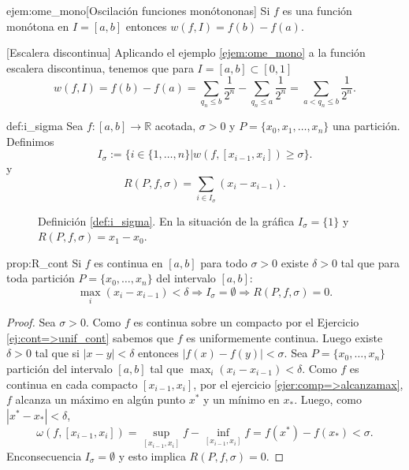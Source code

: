  

\begin{ejercicio}{ejem:ome_mono}[Oscilación funciones monótononas]  Si $f$ es una función monótona   en $I=[a,b]$ entonces $w(f,I)=f(b)-f(a)$.
\end{ejercicio}

 \begin{ejemplo}{}[Escalera discontinua]  Aplicando el ejemplo \ref{ejem:ome_mono}  a la función escalera discontinua,  tenemos que para $I=[a,b]\subset [0,1]$ 
  \[
   w(f,I)=f(b)-f(a)= \sum_{q_n\leq  b}\frac{1}{2^n}-\sum_{q_n\leq  a}\frac{1}{2^n}=\sum_{a<q_n\leq  b}\frac{1}{2^n}.
  \]



\end{ejemplo}










\begin{definicion}{def:i_sigma} Sea $f:[a,b]\to\mathbb{R}$ acotada, $\sigma>0$ y $P=\{x_0,x_1,\ldots,x_n\}$ una partición. Definimos
\[
 I_{\sigma}:=\{i\in\{1,\ldots,n\}|w(f,[x_{i-1},x_i])\geq\sigma\}.
\]
y
\[
 R(P,f,\sigma)=\sum_{i\in I_{\sigma}}(x_i-x_{i-1}).
\]
\end{definicion}



\begin{figure}[h]
\begin{center}
\def\svgwidth{10cm}

\end{center}
 \caption{ Definición \ref{def:i_sigma}. En la situación de la gráfica $I_{\sigma}=\{1\}$ y $R(P,f,\sigma)=x_1-x_0$.}
\end{figure}



\begin{proposicion}{prop:R_cont} Si $f$ es continua en $[a,b]$ para todo $\sigma>0$ existe $\delta>0$ tal que para toda partición $P=\{x_0,\dots,x_n\}$ del intervalo $[a,b]$:
\[
\max_i(x_i-x_{i-1})<\delta\Rightarrow I_{\sigma}=\emptyset\Rightarrow R(P,f,\sigma)=0. 
\]

 
\end{proposicion}

\begin{proof} Sea $\sigma>0$. Como $f$ es continua sobre un compacto por el Ejercicio \ref{ej:cont=>unif_cont} sabemos que $f$ es uniformemente continua. Luego existe $\delta>0$  tal que si $|x-y|<\delta$ entonces $|f(x)-f(y)|<\sigma$. Sea  $P=\{x_0,\dots,x_n\}$ partición del intervalo $[a,b]$ tal que $\max_i(x_i-x_{i-1})<\delta$. Como $f$ es continua en cada compacto $[x_{i-1},x_i]$, por el ejercicio \ref{ejer:comp=>alcanzamax}, $f$ alcanza un máximo en algún punto $x^*$ y un mínimo en $x_*$. Luego, como $|x^*-x_*|<\delta$, 
$$\omega(f,[x_{i-1},x_i])=\sup_{[x_{i-1},x_i]}f - \inf_{[x_{i-1},x_i]}f=f(x^*)-f(x_*)<\sigma.$$ 
Enconsecuencia $I_{\sigma}=\emptyset$ y esto implica $R(P,f,\sigma)=0$. 
\end{proof}



